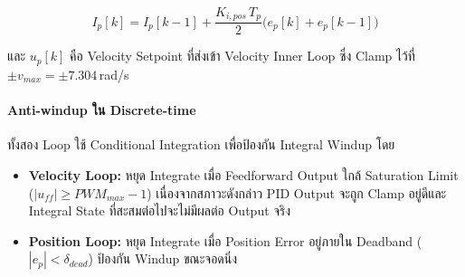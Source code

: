 \begin{equation}
    I_p[k] = I_p[k-1]
           + \frac{K_{i,pos}\,T_p}{2}
             \bigl(e_p[k] + e_p[k-1]\bigr)
    \label{eq:pos_integral_update}
\end{equation}

และ $u_p[k]$ คือ Velocity Setpoint
ที่ส่งเข้า Velocity Inner Loop
ซึ่ง Clamp ไว้ที่ $\pm v_{max} = \pm 7.304$\,rad/s

\paragraph{Anti-windup ใน Discrete-time}

ทั้งสอง Loop ใช้ Conditional Integration
เพื่อป้องกัน Integral Windup โดย

\begin{itemize}
    \item \textbf{Velocity Loop:}
          หยุด Integrate เมื่อ Feedforward Output
          ใกล้ Saturation Limit
          ($|u_{ff}| \geq PWM_{max} - 1$)
          เนื่องจากสภาวะดังกล่าว PID Output
          จะถูก Clamp อยู่ดีและ Integral State
          ที่สะสมต่อไปจะไม่มีผลต่อ Output จริง

    \item \textbf{Position Loop:}
          หยุด Integrate เมื่อ Position Error
          อยู่ภายใน Deadband
          ($|e_p| < \delta_{dead}$)
          ป้องกัน Windup ขณะจอดนิ่ง
\end{itemize}

